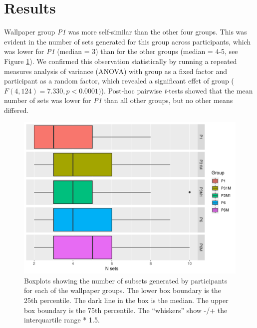 \documentclass[11pt, twoside]{article}
\begin{document}
\section*{Results}
Wallpaper group \textit{P1} was more self-similar than the other four groups. This was evident in the number of sets generated for this group across participants, which was lower for \textit{P1} (median = 3) than for the other groups (median = 4-5, see Figure \ref{fig:n_sets_summary}). We confirmed this observation statistically by running a repeated measures analysis of variance (ANOVA) with group as a fixed factor and participant as a random factor, which revealed a significant effet of group ($F(4, 124) = 7.330, p < 0.0001)$). Post-hoc pairwise \textit{t}-tests showed that the mean number of sets was lower for \textit{P1} than all other groups, but no other means differed.
\begin{figure}[t]
	\centering
	\includegraphics[width=\linewidth]{./figures/nsets_summary.pdf}
	\caption{Boxplots showing the number of subsets generated by participants for each of the wallpaper groups. The lower box boundary is the 25th percentile. The dark line in the box is the median. The upper box boundary is the 75th percentile. The “whiskers” show -/+ the interquartile range * 1.5.}
	\label{fig:n_sets_summary}
\end{figure}
\end{document}

